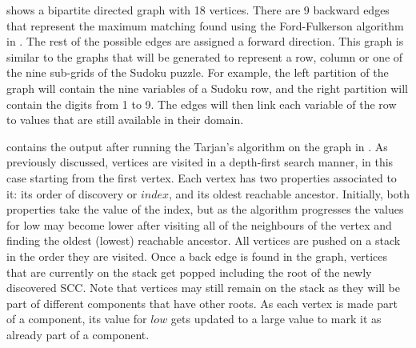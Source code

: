 \documentclass{l4proj}
\begin{document}
\noindent {} shows a bipartite directed graph with 18 vertices. There are 9 backward edges that represent the maximum matching found using the Ford-Fulkerson algorithm \cite{ford1956maximal} in . The rest of the possible edges are assigned a forward direction. This graph is similar to the graphs that will be generated to represent a row, column or one of the nine sub-grids of the Sudoku puzzle. For example, the left partition of the graph will contain the nine variables of a Sudoku row, and the right partition will contain the digits from 1 to 9. The edges will then link each variable of the row to values that are still available in their domain.

\noindent {} contains the output after running the Tarjan's algorithm \cite{tarjan1972depth} on the graph in . As previously discussed, vertices are visited in a depth-first search manner, in this case starting from the first vertex. Each vertex has two properties associated to it: its order of discovery or $index$, and its oldest reachable ancestor. Initially, both properties take the value of the index, but as the algorithm progresses the values for low may become lower after visiting all of the neighbours of the vertex and finding the oldest (lowest) reachable ancestor. All vertices are pushed on a stack in the order they are visited. Once a back edge is found in the graph, vertices that are currently on the stack get popped including the root of the newly discovered SCC. Note that vertices may still remain on the stack as they will be part of different components that have other roots. As each vertex is made part of a component, its value for $low$ gets updated to a large value to mark it as already part of a component.

\newpage
\end{document}
